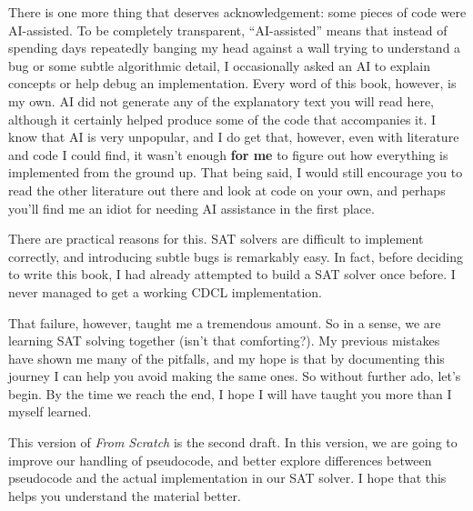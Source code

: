 There is one more thing that deserves acknowledgement: some pieces of code were AI-assisted.
To be completely transparent, ``AI-assisted'' means that instead of spending days repeatedly 
banging my head against a wall trying to understand a bug or some subtle algorithmic detail, 
I occasionally asked an AI to explain concepts or help debug an implementation. Every word of this book, 
however, is my own. AI did not generate any of the explanatory text you will read here, 
although it certainly helped produce some of the code that accompanies it. I know that AI 
is very unpopular, and I do get that, however, even with literature and code I could find, it 
wasn't enough \textbf{for me} to figure out how everything is implemented from the ground up. 
That being said, I would still encourage you to read the other literature out there and look 
at code on your own, and perhaps you'll find me an idiot for needing AI assistance in the first 
place.

There are practical reasons for this. SAT solvers are difficult to implement correctly, 
and introducing subtle bugs is remarkably easy. In fact, before deciding to write this book, 
I had already attempted to build a SAT solver once before. I never managed to get a working CDCL 
implementation.

That failure, however, taught me a tremendous amount. So in a sense, we are learning
SAT solving together (isn't that comforting?). My previous mistakes have shown me many 
of the pitfalls, and my hope is that by documenting this journey I can help you avoid making the same ones.
So without further ado, let's begin. By the time we reach the end, I hope I will have 
taught you more than I myself learned.

This version of \textit{From Scratch} is the second draft. In this version, we are going to 
improve our handling of pseudocode, and better explore differences between pseudocode and the 
actual implementation in our SAT solver. I hope that this helps you understand the material better.